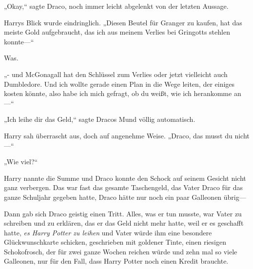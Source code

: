 „Okay,“ sagte Draco, noch immer leicht abgelenkt von der letzten Aussage.

Harrys Blick wurde eindringlich. „Diesen Beutel für Granger zu kaufen, hat das meiste Gold aufgebraucht, das ich aus meinem Verlies bei Gringotts stehlen konnte—“

Was.

„- und McGonagall hat den Schlüssel zum Verlies oder jetzt vielleicht auch Dumbledore. Und ich wollte gerade einen Plan in die Wege leiten, der einiges kosten könnte, also habe ich mich gefragt, ob du weißt, wie ich herankomme an—“

„Ich leihe dir das Geld,“ sagte Dracos Mund völlig automatisch.

Harry sah überrascht aus, doch auf angenehme Weise. „Draco, das musst du nicht—“

„Wie viel?“

Harry nannte die Summe und Draco konnte den Schock auf seinem Gesicht nicht ganz verbergen. Das war fast das gesamte Taschengeld, das Vater Draco für das ganze Schuljahr gegeben hatte, Draco hätte nur noch ein paar Galleonen übrig—

Dann gab sich Draco geistig einen Tritt. Alles, was er tun musste, war Vater zu schreiben und zu erklären, das er das Geld nicht mehr hatte, weil er es geschafft hatte, \emph{es Harry Potter zu leihen} und Vater würde ihm eine besondere Glückwunschkarte schicken, geschrieben mit goldener Tinte, einen riesigen Schokofrosch, der für zwei ganze Wochen reichen würde und zehn mal so viele Galleonen, nur für den Fall, dass Harry Potter noch einen Kredit brauchte.

